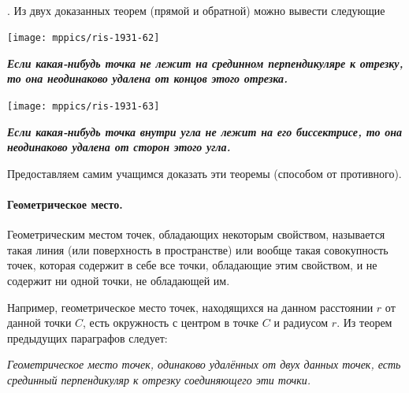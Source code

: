 \documentclass[oneside]{book}
\begin{document}
\paragraph{}\label{1938/59}
.
Из двух доказанных теорем (прямой и обратной) можно вывести следующие 

\medskip

\begin{paracol}{2}

{\centering
\texttt{[image: mppics/ris-1931-62]}
\label{1931/ris-62}
\addtocounter{figure}{1}
}

\medskip

{\sloppy
\textbf{\emph{Если какая-нибудь точка не лежит на срединном перпендикуляре к отрезку, то она неодинаково удалена от концов этого отрезка.}}





}

\switchcolumn

{\centering
\texttt{[image: mppics/ris-1931-63]}
\label{1931/ris-63}
\addtocounter{figure}{1}
}

\medskip

{\sloppy

\textbf{\emph{Если какая-нибудь точка внутри угла не лежит на его биссектрисе, то она неодинаково удалена от сторон этого угла.}}


}

\end{paracol}
\setlength{\columnseprule}{0pt}

\medskip

Предоставляем самим учащимся доказать эти теоремы (способом от противного).

\paragraph{Геометрическое место.}\label{1938/60}
Геометрическим местом точек, обладающих некоторым свойством, называется такая линия (или поверхность в пространстве) или вообще такая совокупность точек, которая содержит в себе все точки, обладающие этим свойством, и не содержит ни одной точки, не обладающей им.

Например, геометрическое место точек, находящихся на данном расстоянии $r$ от данной точки $C$, есть окружность с центром в точке $C$ и радиусом $r$.
Из теорем предыдущих параграфов следует:

\emph{Геометрическое место точек, одинаково удалённых от двух данных точек, есть срединный перпендикуляр к отрезку соединяющего эти точки.} 
\end{document}
